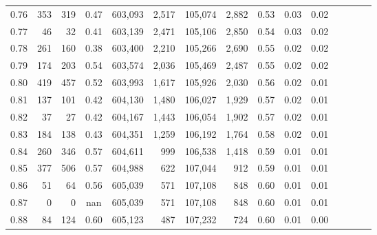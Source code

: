 \begin{tabular}{rrrcrrrrrrrrrrr}
0.76 &     353 &    319 &                                       0.47 &  603,093 &    2,517 &  105,074 &    2,882 &  0.53 &  0.03 &                         0.02 \\
0.77 &      46 &     32 &                                       0.41 &  603,139 &    2,471 &  105,106 &    2,850 &  0.54 &  0.03 &                         0.02 \\
0.78 &     261 &    160 &                                       0.38 &  603,400 &    2,210 &  105,266 &    2,690 &  0.55 &  0.02 &                         0.02 \\
0.79 &     174 &    203 &                                       0.54 &  603,574 &    2,036 &  105,469 &    2,487 &  0.55 &  0.02 &                         0.02 \\
0.80 &     419 &    457 &                                       0.52 &  603,993 &    1,617 &  105,926 &    2,030 &  0.56 &  0.02 &                         0.01 \\
0.81 &     137 &    101 &                                       0.42 &  604,130 &    1,480 &  106,027 &    1,929 &  0.57 &  0.02 &                         0.01 \\
0.82 &      37 &     27 &                                       0.42 &  604,167 &    1,443 &  106,054 &    1,902 &  0.57 &  0.02 &                         0.01 \\
0.83 &     184 &    138 &                                       0.43 &  604,351 &    1,259 &  106,192 &    1,764 &  0.58 &  0.02 &                         0.01 \\
0.84 &     260 &    346 &                                       0.57 &  604,611 &      999 &  106,538 &    1,418 &  0.59 &  0.01 &                         0.01 \\
0.85 &     377 &    506 &                                       0.57 &  604,988 &      622 &  107,044 &      912 &  0.59 &  0.01 &                         0.01 \\
0.86 &      51 &     64 &                                       0.56 &  605,039 &      571 &  107,108 &      848 &  0.60 &  0.01 &                         0.01 \\
0.87 &       0 &      0 &                                        nan &  605,039 &      571 &  107,108 &      848 &  0.60 &  0.01 &                         0.01 \\
0.88 &      84 &    124 &                                       0.60 &  605,123 &      487 &  107,232 &      724 &  0.60 &  0.01 &                         0.00 \\

\end{tabular}
